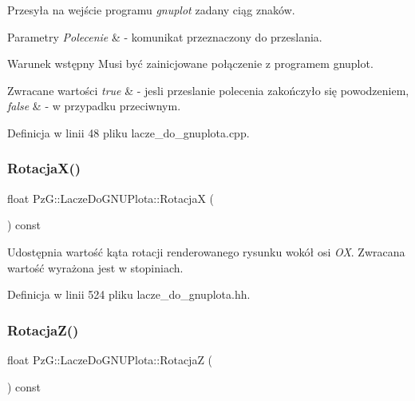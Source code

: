 Przesyła na wejście programu {\itshape gnuplot} zadany ciąg znaków. 
\begin{DoxyParams}{Parametry}
{\em Polecenie} & -\/ komunikat przeznaczony do przeslania.\\
\hline
\end{DoxyParams}
\begin{DoxyPrecond}{Warunek wstępny}
Musi być zainicjowane połączenie z programem gnuplot.
\end{DoxyPrecond}

\begin{DoxyRetVals}{Zwracane wartości}
{\em true} & -\/ jesli przeslanie polecenia zakończyło się powodzeniem, \\
\hline
{\em false} & -\/ w przypadku przeciwnym. \\
\hline
\end{DoxyRetVals}


Definicja w linii 48 pliku lacze\+\_\+do\+\_\+gnuplota.\+cpp.

\mbox{\label{class_pz_g_1_1_lacze_do_g_n_u_plota_addf0b844f626f3f5220de70efcbbdbb3}} 
\subsubsection{\texorpdfstring{RotacjaX()}{RotacjaX()}}
{\footnotesize\ttfamily float Pz\+G\+::\+Lacze\+Do\+G\+N\+U\+Plota\+::\+RotacjaX (\begin{DoxyParamCaption}{ }\end{DoxyParamCaption}) const\hspace{0.3cm}{\ttfamily [inline]}}

Udostępnia wartość kąta rotacji renderowanego rysunku wokół osi {\itshape OX}. Zwracana wartość wyrażona jest w stopiniach. 

Definicja w linii 524 pliku lacze\+\_\+do\+\_\+gnuplota.\+hh.

\mbox{\label{class_pz_g_1_1_lacze_do_g_n_u_plota_a9dac73754fab10644b287756003e9c79}} 
\subsubsection{\texorpdfstring{RotacjaZ()}{RotacjaZ()}}
{\footnotesize\ttfamily float Pz\+G\+::\+Lacze\+Do\+G\+N\+U\+Plota\+::\+RotacjaZ (\begin{DoxyParamCaption}{ }\end{DoxyParamCaption}) const\hspace{0.3cm}{\ttfamily [inline]}}

